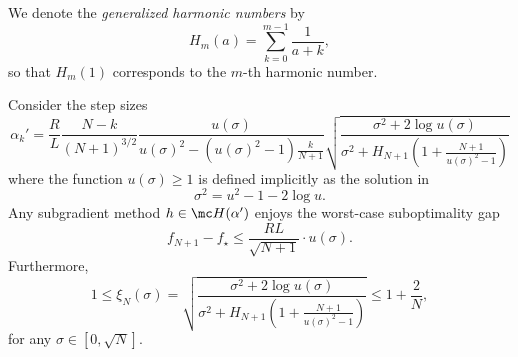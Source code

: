 \documentclass{article}
\begin{document}
We denote the \emph{generalized harmonic numbers} by
\[
H_m(a)=\sum_{k=0}^{m-1}\frac1{a+k},
\]
so that $H_m(1)$ corresponds to the $m$-th harmonic number.
\begin{lemma}\label{lem:admissible}
    Consider the step sizes
    \[
    \alpha_k'=\frac{R}{L}\frac{N-k}{(N+1)^{3/2}}\frac{u(\sigma)}{u(\sigma)^2-(u(\sigma)^2-1)\frac{k}{N+1}}\sqrt{\frac{\sigma^2+2\log u(\sigma)}{\sigma^2+H_{N+1}\left(1+\frac{N+1}{u(\sigma)^2-1}\right)}}
    \]
    where the function $u(\sigma)\ge1$ is defined implicitly as the solution in
    \begin{equation}\label{eq:lambda-implicit}
        \sigma^2=u^2-1-2\log u.
    \end{equation}
    Any subgradient method $h\in \mc H(\alpha')$ enjoys the worst-case suboptimality gap
    \[
    f_{N+1}-f_\star \le \frac{RL}{\sqrt{N+1}}\cdot u(\sigma).
    \]
    Furthermore,
    \begin{equation}\label{eq:negligible-factor}
    1\le  \xi_N(\sigma) = \sqrt{\frac{\sigma^2+2\log u(\sigma)}{\sigma^2+H_{N+1}\left(1+\frac{N+1}{u(\sigma)^2-1}\right)}}\le 1+\frac{2}{N},
    \end{equation}
    for any $\sigma\in[0,\sqrt{N}]$.
\end{lemma}
\end{document}
